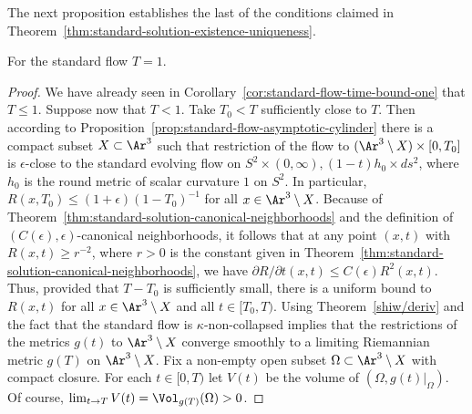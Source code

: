 The next proposition establishes the last of the conditions claimed
in Theorem~\ref{thm:standard-solution-existence-uniqueness}.


\begin{theorem}[The standard flow exists exactly on $[0,1)$]
\label{thm:standard-solution-time-interval-one}
For the standard flow $T=1$.
\end{theorem}

\begin{proof}
We have already seen in Corollary~\ref{cor:standard-flow-time-bound-one} that $T\le 1$. Suppose now
that $T<1$. Take $T_0<T$ sufficiently close to $T$. Then according
to Proposition~\ref{prop:standard-flow-asymptotic-cylinder} there is a compact subset $X\subset
\Ar^3$ such that restriction of the flow to $(\Ar^3\setminus
X)\times [0,T_0]$ is $\epsilon$-close to the standard evolving flow
on $S^2\times (0,\infty),(1-t)h_0\times ds^2$, where $h_0$ is the
round metric of scalar curvature $1$ on $S^2$. In particular,
$R(x,T_0)\le (1+\epsilon)(1-T_0)^{-1}$ for all $x\in \Ar^3\setminus
X$. Because of Theorem~\ref{thm:standard-solution-canonical-neighborhoods} and the definition of
$(C(\epsilon),\epsilon)$-canonical neighborhoods, it follows that at
any point $(x,t)$ with $R(x,t)\ge r^{-2}$, where $r>0$ is the
constant given in Theorem~\ref{thm:standard-solution-canonical-neighborhoods}, we have $\partial
R/\partial t(x,t)\le C(\epsilon)R^2(x,t)$. Thus, provided that
$T-T_0$ is sufficiently small, there is a uniform bound to $R(x,t)$
for all $x\in \Ar^3\setminus X$ and all $t\in [T_0,T)$. Using
Theorem~\ref{shiw/deriv} and the fact that the standard flow is
$\kappa$-non-collapsed implies that the restrictions of the metrics
$g(t)$ to $\Ar^3\setminus X$ converge smoothly to a limiting
Riemannian metric $g(T)$ on $\Ar^3\setminus X$. Fix a non-empty open
subset $\Omega\subset \Ar^3\setminus X$ with compact closure. For
each $t\in [0,T)$ let $V(t)$ be the volume of
$(\Omega,g(t)|_{\Omega})$. Of course, $\lim_{t\rightarrow
T}V(t)=\Vol_{g(T)}(\Omega)>0$.





\end{proof}
